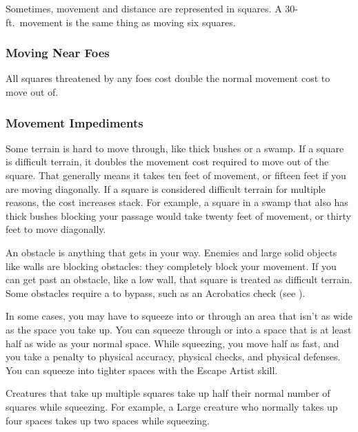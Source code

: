             Sometimes, movement and distance are represented in squares.
            A 30-ft.\ movement is the same thing as moving six squares.

        \subsubsection{Moving Near Foes}\label{Moving Near Foes}
            All squares threatened by any foes cost double the normal movement cost to move out of.


        \subsubsection{Movement Impediments}

            \label{Difficult Terrain}
            Some terrain is hard to move through, like thick bushes or a swamp. If a square is difficult terrain, it doubles the movement cost required to move out of the square. That generally means it takes ten feet of movement, or fifteen feet if you are moving diagonally. If a square is considered difficult terrain for multiple reasons, the cost increases stack. For example, a square in a swamp that also has thick bushes blocking your passage would take twenty feet of movement, or thirty feet to move diagonally.

            An obstacle is anything that gets in your way. Enemies and large solid objects like walls are blocking obstacles: they completely block your movement. If you can get past an obstacle, like a low wall, that square is treated as difficult terrain. Some obstacles require a  to bypass, such as an Acrobatics check (see ).

            \label{Squeezing}
            In some cases, you may have to squeeze into or through an area that isn't as wide as the space you take up. You can squeeze through or into a space that is at least half as wide as your normal space. While squeezing, you move half as fast, and you take a  penalty to physical accuracy, physical checks, and physical defenses. You can squeeze into tighter spaces with the Escape Artist skill.

            Creatures that take up multiple squares take up half their normal number of squares while squeezing. For example, a Large creature who normally takes up four spaces takes up two spaces while squeezing.

